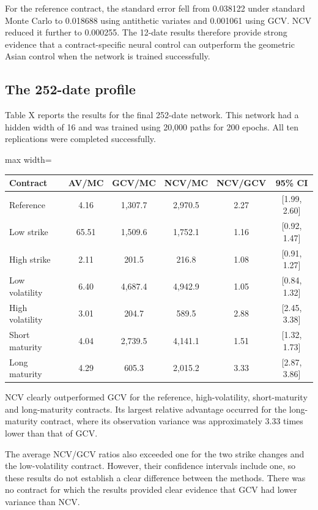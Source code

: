 For the reference contract, the standard error fell from 0.038122 under standard Monte Carlo to 0.018688 using antithetic variates and 0.001061 using GCV. NCV reduced it further to 0.000255. The 12-date results therefore provide strong evidence that a contract-specific neural control can outperform the geometric Asian control when the network is trained successfully.

\subsection{The 252-date profile}

Table X reports the results for the final 252-date network. This network had a hidden width of 16 and was trained using 20,000 paths for 200 epochs. All ten replications were completed successfully.

\begin{table}[h]
\centering
\begin{adjustbox}{max width=\textwidth}
\begin{tabular}{lccccc}
\hline
Contract & AV/MC & GCV/MC & NCV/MC & NCV/GCV & 95\% CI \\
\hline
Reference & 4.16 & 1,307.7 & 2,970.5 & 2.27 & [1.99, 2.60] \\
Low strike & 65.51 & 1,509.6 & 1,752.1 & 1.16 & [0.92, 1.47] \\
High strike & 2.11 & 201.5 & 216.8 & 1.08 & [0.91, 1.27] \\
Low volatility & 6.40 & 4,687.4 & 4,942.9 & 1.05 & [0.84, 1.32] \\
High volatility & 3.01 & 204.7 & 589.5 & 2.88 & [2.45, 3.38] \\
Short maturity & 4.04 & 2,739.5 & 4,141.1 & 1.51 & [1.32, 1.73] \\
Long maturity & 4.29 & 605.3 & 2,015.2 & 3.33 & [2.87, 3.86] \\
\hline
\end{tabular}
\end{adjustbox}
\end{table}

NCV clearly outperformed GCV for the reference, high-volatility, short-maturity and long-maturity contracts. Its largest relative advantage occurred for the long-maturity contract, where its observation variance was approximately 3.33 times lower than that of GCV.

The average NCV/GCV ratios also exceeded one for the two strike changes and the low-volatility contract. However, their confidence intervals include one, so these results do not establish a clear difference between the methods. There was no contract for which the results provided clear evidence that GCV had lower variance than NCV.

